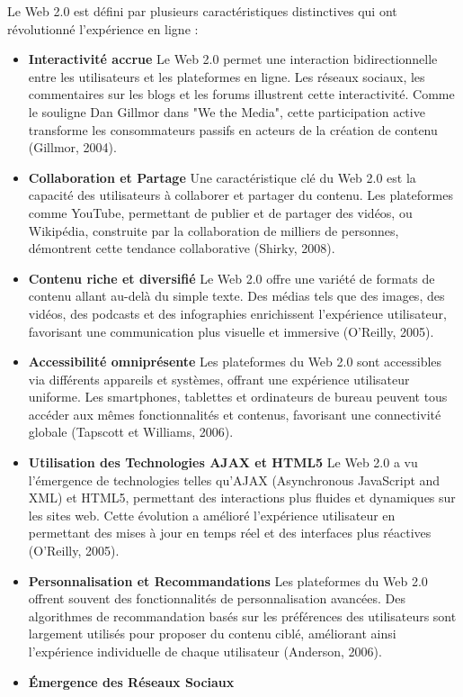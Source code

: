 \documentclass[12pt,a4paper]{article} %
\begin{document}
	Le Web 2.0 est défini par plusieurs caractéristiques distinctives qui ont révolutionné l'expérience en ligne :
	\begin{itemize}
		\item \textbf{Interactivité accrue}
		Le Web 2.0 permet une interaction bidirectionnelle entre les utilisateurs et les plateformes en ligne. Les réseaux sociaux, les commentaires sur les blogs et les forums illustrent cette interactivité. Comme le souligne Dan Gillmor dans "We the Media", cette participation active transforme les consommateurs passifs en acteurs de la création de contenu (Gillmor, 2004).
		\item \textbf{Collaboration et Partage}
		Une caractéristique clé du Web 2.0 est la capacité des utilisateurs à collaborer et partager du contenu. Les plateformes comme YouTube, permettant de publier et de partager des vidéos, ou Wikipédia, construite par la collaboration de milliers de personnes, démontrent cette tendance collaborative (Shirky, 2008).
		\item \textbf{Contenu riche et diversifié}
		Le Web 2.0 offre une variété de formats de contenu allant au-delà du simple texte. Des médias tels que des images, des vidéos, des podcasts et des infographies enrichissent l'expérience utilisateur, favorisant une communication plus visuelle et immersive (O'Reilly, 2005).
		\item \textbf{Accessibilité omniprésente}
		Les plateformes du Web 2.0 sont accessibles via différents appareils et systèmes, offrant une expérience utilisateur uniforme. Les smartphones, tablettes et ordinateurs de bureau peuvent tous accéder aux mêmes fonctionnalités et contenus, favorisant une connectivité globale (Tapscott et Williams, 2006).
		\item\textbf{Utilisation des Technologies AJAX et HTML5}
		Le Web 2.0 a vu l'émergence de technologies telles qu'AJAX (Asynchronous JavaScript and XML) et HTML5, permettant des interactions plus fluides et dynamiques sur les sites web. Cette évolution a amélioré l'expérience utilisateur en permettant des mises à jour en temps réel et des interfaces plus réactives (O'Reilly, 2005).
		\item \textbf{Personnalisation et Recommandations}
		Les plateformes du Web 2.0 offrent souvent des fonctionnalités de personnalisation avancées. Des algorithmes de recommandation basés sur les préférences des utilisateurs sont largement utilisés pour proposer du contenu ciblé, améliorant ainsi l'expérience individuelle de chaque utilisateur (Anderson, 2006).
		\item \textbf{Émergence des Réseaux Sociaux}

\end{itemize}
\end{document}

